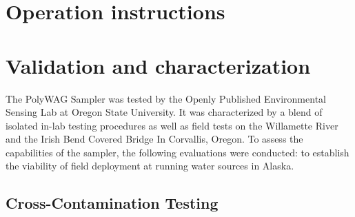 \documentclass[11pt, letterpaper]{article}
\begin{document}
\section{Operation instructions}



\section{Validation and characterization}


The PolyWAG Sampler was tested by the Openly Published Environmental Sensing Lab at Oregon State University. It was characterized by a blend of isolated in-lab testing procedures as well as field tests on the Willamette River and the Irish Bend Covered Bridge In Corvallis, Oregon. To assess the capabilities of the sampler, the following evaluations were conducted: to establish the viability of field deployment at running water sources in Alaska.

\subsection{Cross-Contamination Testing}
\end{document}
